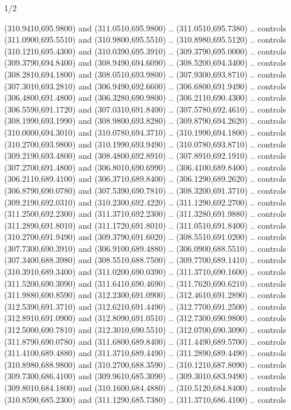 \begin{flagdescription}{1/2}
\begin{scope}[xshift=0.5\flaglength]
\begin{scope}[scale=0.00745\flagwidth,xshift=-12.1mm,yshift=41.7mm]
\begin{scope}[y=0.80pt, x=0.80pt, yscale=-1, xscale=1, inner sep=0pt, outer sep=0pt]
\begin{scope}[cm={{1.33333,0.0,0.0,-1.33333,(0.0,114.66667)}}]
\begin{scope}[scale=0.100]
  (310.9410,695.9800) and (311.0510,695.9800) .. (311.0510,695.7380) .. controls
  (311.0900,695.5510) and (310.9800,695.5510) .. (310.8980,695.5120) .. controls
  (310.1210,695.4300) and (310.0390,695.3910) .. (309.3790,695.0000) .. controls
  (309.3790,694.8400) and (308.9490,694.6090) .. (308.5200,694.3400) .. controls
  (308.2810,694.1800) and (308.0510,693.9800) .. (307.9300,693.8710) .. controls
  (307.3010,693.2810) and (306.9490,692.6600) .. (306.6800,691.9490) .. controls
  (306.4800,691.4800) and (306.3280,690.9800) .. (306.2110,690.4300) .. controls
  (306.5590,691.1720) and (307.0310,691.8400) .. (307.5780,692.4610) .. controls
  (308.1990,693.1990) and (308.9800,693.8280) .. (309.8790,694.2620) .. controls
  (310.0000,694.3010) and (310.0780,694.3710) .. (310.1990,694.1800) .. controls
  (310.2700,693.9800) and (310.1990,693.9490) .. (310.0780,693.8710) .. controls
  (309.2190,693.4800) and (308.4800,692.8910) .. (307.8910,692.1910) .. controls
  (307.2700,691.4800) and (306.8010,690.6990) .. (306.4100,689.8400) .. controls
  (306.2110,689.4100) and (306.3710,689.8400) .. (306.1290,689.2620) .. controls
  (306.8790,690.0780) and (307.5390,690.7810) .. (308.3200,691.3710) .. controls
  (309.2190,692.0310) and (310.2300,692.4220) .. (311.1290,692.2700) .. controls
  (311.2500,692.2300) and (311.3710,692.2300) .. (311.3280,691.9880) .. controls
  (311.2890,691.8010) and (311.1720,691.8010) .. (311.0510,691.8400) .. controls
  (310.2700,691.9490) and (309.3790,691.6020) .. (308.5510,691.0200) .. controls
  (307.7300,690.3910) and (306.9100,689.4880) .. (306.0900,688.5510) .. controls
  (307.3400,688.3980) and (308.5510,688.7500) .. (309.7700,689.1410) .. controls
  (310.3910,689.3400) and (311.0200,690.0390) .. (311.3710,690.1600) .. controls
  (311.5200,690.3090) and (311.6410,690.4690) .. (311.7620,690.6210) .. controls
  (311.9880,690.8590) and (312.2300,691.0900) .. (312.4610,691.2890) .. controls
  (312.5390,691.3710) and (312.6210,691.4490) .. (312.7700,691.2500) .. controls
  (312.8910,691.0900) and (312.8090,691.0510) .. (312.7300,690.9800) .. controls
  (312.5000,690.7810) and (312.3010,690.5510) .. (312.0700,690.3090) .. controls
  (311.8790,690.0780) and (311.6800,689.8400) .. (311.4490,689.5700) .. controls
  (311.4100,689.4880) and (311.3710,689.4490) .. (311.2890,689.4490) .. controls
  (310.8980,688.9800) and (310.2700,688.3590) .. (310.1210,687.8090) .. controls
  (309.7300,686.4100) and (309.9610,685.3090) .. (309.3010,683.9490) .. controls
  (309.8010,684.1800) and (310.1600,684.4880) .. (310.5120,684.8400) .. controls
  (310.8590,685.2300) and (311.1290,685.7380) .. (311.3710,686.4100) .. controls

\end{scope}
\end{scope}
\end{scope}
\end{scope}
\end{scope}
\end{flagdescription}
